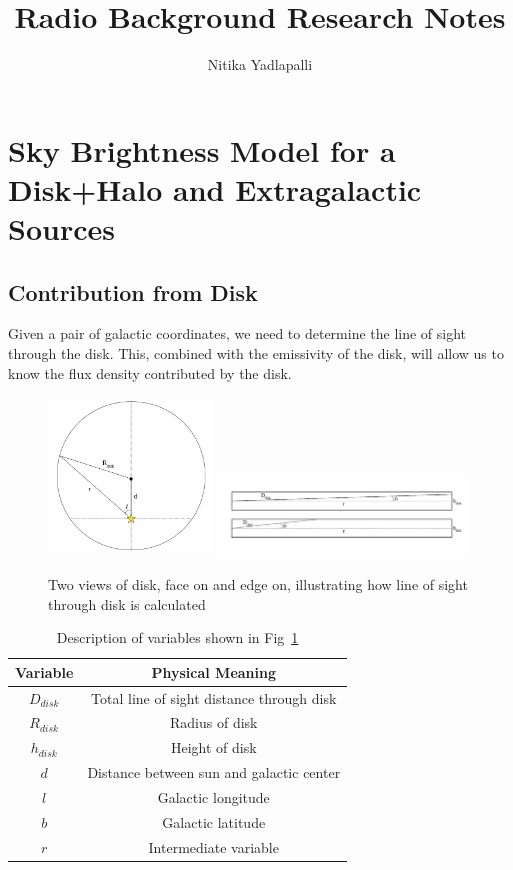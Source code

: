 \documentclass[letterpaper, 10pt]{article}
\title{Radio Background Research Notes}
\author{Nitika Yadlapalli}
\date{}
\begin{document}
\maketitle

\section{Sky Brightness Model for a Disk+Halo and Extragalactic Sources}

\subsection{Contribution from Disk}
Given a pair of galactic coordinates, we need to determine the line of sight through the disk. This, combined with the emissivity of the disk, will allow us to know the flux density contributed by the disk.

\begin{figure}[h]
\begin{center}
\includegraphics[width=0.39\textwidth]{disk_face.jpg}
\includegraphics[width=0.59\textwidth]{disk_edge.jpg}
\caption{Two views of disk, face on and edge on, illustrating how line of sight through disk is calculated}
\label{disk}
\end{center}
\end{figure}

\begin{table}[h]
\centering
\begin{tabular}{| c | c |}
\hline
\textbf{Variable} & \textbf{Physical Meaning} \\
\hline
$D_{disk}$ & Total line of sight distance through disk \\
\hline
$R_{disk}$ & Radius of disk \\
\hline
$h_{disk}$ & Height of disk \\
\hline
$d$ & Distance between sun and galactic center \\
\hline
$l$ & Galactic longitude \\
\hline
$b$ & Galactic latitude \\
\hline
$r$ & Intermediate variable \\
\hline
\end{tabular}
\caption{Description of variables shown in Fig~\ref{disk}}
\end{table}
\end{document}
